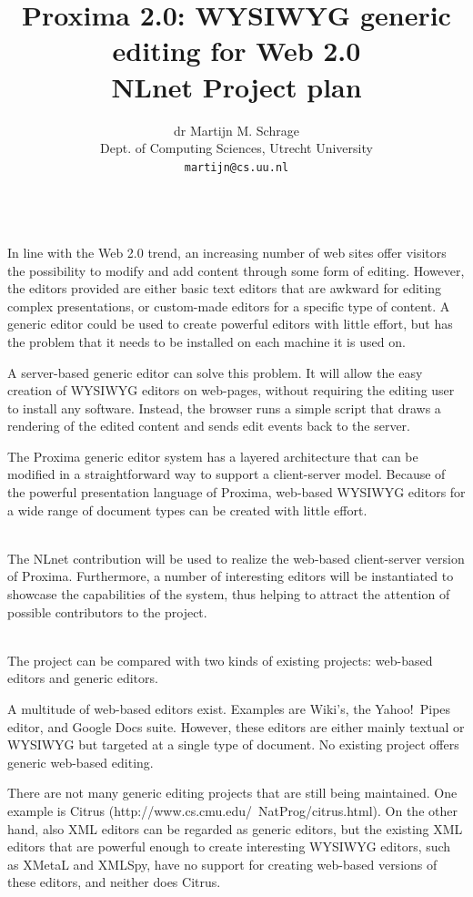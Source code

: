\documentclass[10pt]{article}
\title{Proxima 2.0: WYSIWYG generic editing for Web 2.0\\
\bigskip
        \large NLnet Project plan}
\author{dr Martijn M. Schrage\\
        \small Dept. of Computing Sciences, Utrecht University\\
        \small {\tt martijn@cs.uu.nl}
        }
\date{}
\begin{document}
\maketitle


\\
In line with the Web 2.0 trend, an increasing number of web sites offer visitors the possibility to modify and add content through some form of editing. However, the editors provided are either basic text editors that are awkward for editing complex presentations, or custom-made editors for a specific type of content. A generic editor could be used to create powerful editors with little effort, but has the problem that it needs to be installed on each machine it is used on.

A server-based generic editor can solve this problem. It will allow the easy creation of WYSIWYG editors on web-pages, without requiring the editing user to install any software. Instead, the browser runs a simple script that draws a rendering of the edited content and sends edit events back to the server.

The Proxima generic editor system has a layered architecture that can be modified in a straightforward way to support a client-server model. Because of the powerful presentation language of Proxima, web-based WYSIWYG editors for a wide range of document types can be created with little effort.

\\
The NLnet contribution will be used to realize the web-based client-server version of Proxima. Furthermore, a number of interesting editors will be instantiated to showcase the capabilities of the system, thus helping to  attract the attention of possible contributors to the project.


\\
The project can be compared with two kinds of existing projects: web-based editors and generic editors.

A multitude of web-based editors exist. Examples are Wiki's, the Yahoo!\ Pipes editor, and Google Docs suite. However, these editors are either mainly textual or WYSIWYG but targeted at a single type of document. No existing project offers generic web-based editing.

There are not many generic editing projects that are still being maintained. One example is Citrus (http://www.cs.cmu.edu/~NatProg/citrus.html). On the other hand, also XML editors can be regarded as generic editors, but the existing XML editors that are powerful enough to create interesting WYSIWYG editors, such as XMetaL and XMLSpy, have no support for creating web-based versions of these editors, and neither does Citrus.
\end{document}
